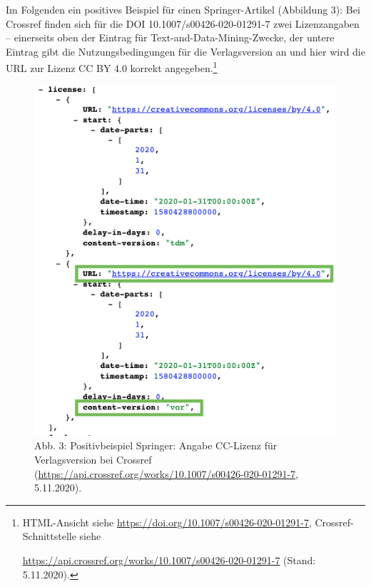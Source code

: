 \documentclass[a4paper,
fontsize=11pt,
oneside,
numbers=noperiodatend,
parskip=half-,
bibliography=totoc,
final
]{scrartcl}
\begin{document}
Im Folgenden ein positives Beispiel für einen Springer-Artikel
(Abbildung 3): Bei Crossref finden sich für die DOI
10.1007/s00426-020-01291-7 zwei Lizenzangaben -- einerseits oben der
Eintrag für Text-and-Data-Mining-Zwecke, der untere Eintrag gibt die
Nutzungsbedingungen für die Verlagsversion an und hier wird die URL zur
Lizenz CC BY 4.0 korrekt angegeben.\footnote{HTML-Ansicht siehe
  \url{https://doi.org/10.1007/s00426-020-01291-7},
  Crossref-Schnittstelle siehe

  \url{https://api.crossref.org/works/10.1007/s00426-020-01291-7} (Stand:
  5.11.2020).}

\begin{figure}
\centering
\includegraphics{img/CRspringerPOS.png}
\caption{Abb. 3: Positivbeispiel Springer: Angabe CC-Lizenz für
Verlagsversion bei Crossref
(\url{https://api.crossref.org/works/10.1007/s00426-020-01291-7},
5.11.2020).}
\end{figure}
\end{document}

